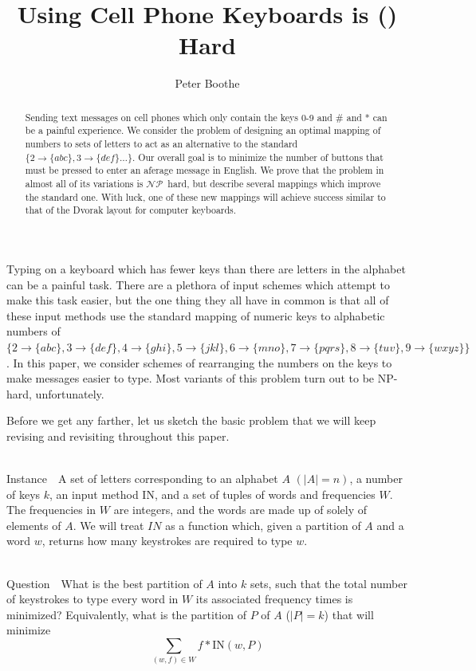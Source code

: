 \documentclass[runningheads]{llncs}
\title{Using Cell Phone Keyboards is (\NP) Hard}
\author{Peter Boothe}
\institute{Manhattan College\\
\email{peter.boothe@manhattan.edu}
}
\newcommand{\NP}{\ensuremath{\mathcal{NP}}}
\newcommand{\Instance}{{\sc Instance~}}
\newcommand{\Question}{~\\
{\sc Question~}}
\begin{document}
\maketitle

\begin{abstract}
Sending text messages on cell phones which only contain the keys 0-9 and \# and
* can be a painful experience.  We consider the problem of designing an optimal
mapping of numbers to sets of letters to act as an alternative to the standard
$\{2\to\{abc\}, 3\to\{def\}\ldots\}$.  Our overall goal is to minimize the
number of buttons that must be pressed to enter an aferage message in English.
We prove that the problem in almost all of its variations is \NP\ hard, but
describe several mappings which improve the standard one.  With luck, one of
these new mappings will achieve success similar to that of the Dvorak layout
for computer keyboards.
\end{abstract}

Typing on a keyboard which has fewer keys than there are letters in the
alphabet can be a painful task.  There are a plethora of input schemes which
attempt to make this task easier, but the one thing they all have in common is
that all of these input methods use the standard mapping of numeric keys to
alphabetic numbers of 
$\{2\to\{abc\},
         3\to\{def\}, 4\to\{ghi\}, 5\to\{jkl\}, 6\to\{mno\}, 7\to\{pqrs\},
         8\to\{tuv\}, 9\to\{wxyz\}\}$.
In this paper, we consider schemes of rearranging the numbers on the keys to
make messages easier to type.  Most variants of this problem turn out to be
NP-hard, unfortunately.

Before we get any farther, let us sketch the basic problem that we will keep
revising and revisiting throughout this paper.  \begin{prob}[{\sc
MinimumKeystrokes}]~\\ \Instance\ A set of letters corresponding to an alphabet
$A$ $(|A| = n)$, a number of keys $k$, an input method $\mathrm{IN}$, and a set
of tuples of words and frequencies $W$.  The frequencies in $W$ are integers,
and the words are made up of solely of elements of $A$.  We will treat $IN$ as
a function which, given a partition of $A$ and a word $w$, returns how many
keystrokes are required to type $w$.

\Question\ What is the best partition of $A$ into $k$ sets, such that the
total number of keystrokes to type every word in $W$ its associated frequency
times is minimized?  Equivalently, what is the partition of $P$ of $A$ ($|P| = k$) that
will minimize
$$\sum_{(w,f)\in W} f*\mathrm{IN}(w,P)$$
\label{probtemplate}
\end{prob}
\end{document}
